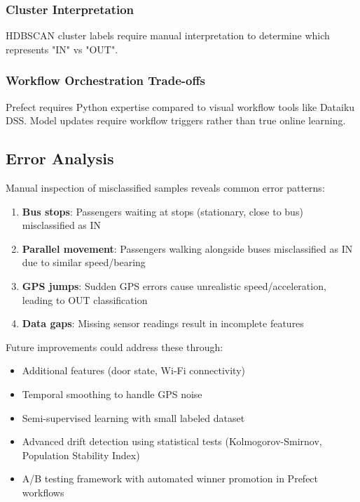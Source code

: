 \subsubsection{Cluster Interpretation}
HDBSCAN cluster labels require manual interpretation to determine which represents "IN" vs "OUT".

\subsubsection{Workflow Orchestration Trade-offs}
Prefect requires Python expertise compared to visual workflow tools like Dataiku DSS. Model updates require workflow triggers rather than true online learning.

\subsection{Error Analysis}

Manual inspection of misclassified samples reveals common error patterns:

\begin{enumerate}
    \item \textbf{Bus stops}: Passengers waiting at stops (stationary, close to bus) misclassified as IN
    \item \textbf{Parallel movement}: Passengers walking alongside buses misclassified as IN due to similar speed/bearing
    \item \textbf{GPS jumps}: Sudden GPS errors cause unrealistic speed/acceleration, leading to OUT classification
    \item \textbf{Data gaps}: Missing sensor readings result in incomplete features
\end{enumerate}

Future improvements could address these through:
\begin{itemize}
    \item Additional features (door state, Wi-Fi connectivity)
    \item Temporal smoothing to handle GPS noise
    \item Semi-supervised learning with small labeled dataset
    \item Advanced drift detection using statistical tests (Kolmogorov-Smirnov, Population Stability Index)
    \item A/B testing framework with automated winner promotion in Prefect workflows
\end{itemize}

